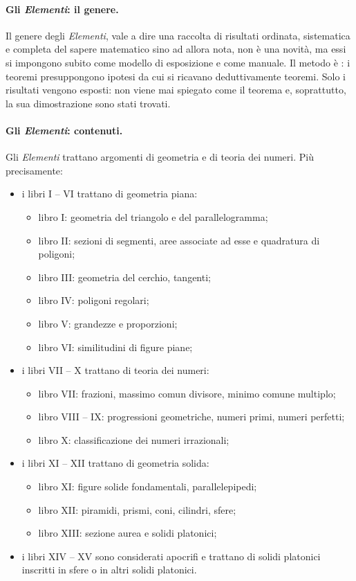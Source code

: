 \paragraph{Gli \textit{Elementi}: il genere.} Il genere degli \textit{Elementi}, vale a dire una raccolta di risultati ordinata, sistematica e completa del sapere matematico sino ad allora nota, non \`e una novit\`a, ma essi si impongono subito come modello di esposizione e come manuale. Il metodo \`e : i teoremi presuppongono ipotesi da cui si ricavano deduttivamente teoremi. Solo i risultati vengono esposti: non viene mai spiegato come il teorema e, soprattutto, la sua dimostrazione sono stati trovati.
\paragraph{Gli \textit{Elementi}: contenuti.} Gli \textit{Elementi} trattano argomenti di geometria e di teoria dei numeri. Pi\`u precisamente:
\begin{itemize}
	\item i libri I -- VI trattano di geometria piana:
	\begin{itemize}
		\item libro I: geometria del triangolo e del parallelogramma;
		\item libro II: sezioni di segmenti, aree associate ad esse e quadratura di poligoni;
		\item libro III: geometria del cerchio, tangenti;
		\item libro IV: poligoni regolari;
		\item libro V: grandezze e proporzioni;
		\item libro VI: similitudini di figure piane;
	\end{itemize}
	\item i libri VII -- X trattano di teoria dei numeri:
	\begin{itemize}
		\item libro VII: frazioni, massimo comun divisore, minimo comune multiplo;
		\item libro VIII -- IX: progressioni geometriche, numeri primi, numeri perfetti;
		\item libro X: classificazione dei numeri irrazionali;
	\end{itemize}
	\item i libri XI -- XII trattano di geometria solida:
	\begin{itemize}
		\item libro XI: figure solide fondamentali, parallelepipedi;
		\item libro XII: piramidi, prismi, coni, cilindri, sfere;
		\item libro XIII: sezione aurea e solidi platonici;
	\end{itemize}
	\item i libri XIV -- XV sono considerati apocrifi e trattano di solidi platonici inscritti in sfere o in altri solidi platonici.
\end{itemize}
